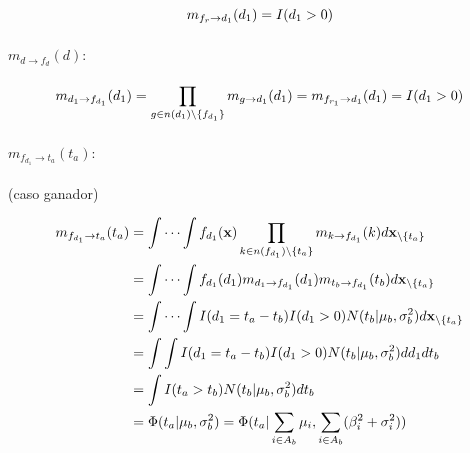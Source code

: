 \documentclass[11pt,twoside,spanish]{report} %
\begin{document}
\begin{equation}
	\centering
	m_{f_{r}\rightarrow d_1}(d_1) = I(d_1>0)
\end{equation}

\paragraph{$m_{d\rightarrow f_{d}}(d):$}

\begin{equation}
	\centering
	m_{d_1\rightarrow f_{d_1}}(d_1) = \prod_{g\in n(d_1)\backslash\{f_{d_1}\}} m_{g\rightarrow d_1}(d_1)
	= m_{f_{r_1}\rightarrow d_1}(d_1)
	=  I(d_1>0)
\end{equation}

\paragraph{$m_{f_{d_1}\rightarrow t_a}(t_a):$} (caso ganador)

\begin{equation}
	\centering
	\begin{split}
		m_{f_{d_1}\rightarrow t_a}(t_a) & = \int\cdots\int f_{d_1}(\textbf{x})\prod_{k\in n(f_{d_1})\backslash\{t_a\}} m_{k\rightarrow f_{d_1}}(k)d\textbf{x}_{\backslash \{t_a\}} \\
		& = \int\cdots\int f_{d_1}(d_1)m_{d_1\rightarrow f_{d_1}}(d_1)m_{t_b\rightarrow f_{d_1}}(t_b)d\textbf{x}_{\backslash\{t_a\}}\\
		& = \int\cdots\int I(d_1=t_a-t_b)I(d_1>0)N(t_b \vert \mu_b,\sigma_b^2)d\textbf{x}_{\backslash\{t_a\}}\\
		& =\int\int  I(d_1=t_a-t_b)I(d_1>0)N(t_b \vert \mu_b,\sigma_b^2)dd_1dt_b\\
		& =\int I(t_a>t_b)N(t_b \vert \mu_b,\sigma_b^2)dt_b\\
		& = \Phi(t_a \vert \mu_b,\sigma_b^2)=  \Phi(t_a \vert \sum_{i\in A_b}\mu_i,\sum_{i\in A_b}(\beta_i^2+\sigma_i^2))
	\end{split}
\end{equation}
\end{document}
